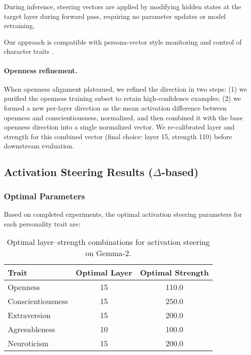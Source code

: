 During inference, steering vectors are applied by modifying hidden states at the target layer during forward pass, requiring no parameter updates or model retraining.

Our approach is compatible with persona-vector style monitoring and control of character traits \citep{chen-2025-persona-vectors}.

\paragraph{Openness refinement.} When openness alignment plateaued, we refined the direction in two steps: (1) we purified the openness training subset to retain high-confidence examples; (2) we formed a new per-layer direction as the mean activation difference between openness and conscientiousness, normalized, and then combined it with the base openness direction into a single normalized vector. We re-calibrated layer and strength for this combined vector (final choice: layer 15, strength 110) before downstream evaluation.

\subsection{Activation Steering Results (\(\Delta\)-based)}

\subsubsection{Optimal Parameters}

Based on completed experiments, the optimal activation steering parameters for each personality trait are:

\begin{table}[H]
\centering
\scriptsize
{\setlength{\tabcolsep}{2pt}\renewcommand{\arraystretch}{0.95}%
\begin{adjustbox}{max width=\linewidth}
\begin{tabular}{lSS}
\toprule
\textbf{Trait} & {Optimal Layer} & {Optimal Strength} \\
\midrule
Openness & 15 & 110.0 \\
Conscientiousness & 15 & 250.0 \\
Extraversion & 15 & 200.0 \\
Agreeableness & 10 & 100.0 \\
Neuroticism & 15 & 200.0 \\
\bottomrule
\end{tabular}
\end{adjustbox}}
\caption{Optimal layer–strength combinations for activation steering on Gemma-2.}
\end{table}

